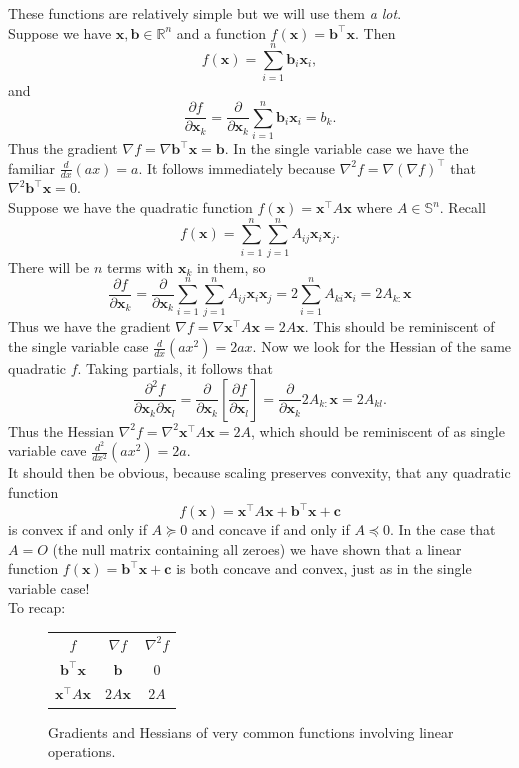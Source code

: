 \documentclass{article}
\newcommand{\1}{\mathbf{1}}
\newcommand{\0}{\mathbf{0}}
\newcommand{\xx}{\mathbf{x}}
\newcommand{\bb}{\mathbf{b}}
\newcommand{\cc}{\mathbf{c}}
\newcommand{\RR}{\mathbb{R}}
\renewcommand{\SS}{\mathbb{S}}
\newcommand{\T}{\top}
\begin{document}
These functions are relatively simple but we will use them \textit{a lot}.\\
Suppose we have $\xx,\bb\in\RR^n$ and a function $f(\xx) = \bb^\T\xx$.
Then
\[
    f(\xx) = \sum_{i=1}^n \bb_i\xx_i,
\]
and
\[
    \frac{\partial f}{\partial \xx_k} = \frac{\partial}{\partial \xx_k} \sum_{i=1}^n \bb_i\xx_i = b_k.
\]
Thus the gradient $\nabla f = \nabla \bb^\T\xx = \bb$. In the single variable case
we have the familiar $\frac{d}{dx}(ax) = a$. It follows immediately because $\nabla^2 f
= \nabla (\nabla f)^\T$ that $\nabla^2 \bb^\T\xx = 0$.\\

Suppose we have the quadratic function $f(\xx) = \xx^\T A\xx$ where $A\in\SS^n$. Recall
\[
    f(\xx) = \sum_{i=1}^n\sum_{j=1}^n A_{ij}\xx_i\xx_j.
\]
There will be $n$ terms with $\xx_k$ in them, so
\[
    \frac{\partial f}{\partial \xx_k} = \frac{\partial}{\partial \xx_k} \sum_{i=1}^n\sum_{j=1}^n A_{ij}\xx_i\xx_j = 2\sum_{i=1}^nA_{ki}\xx_i = 2A_{k:}\xx
\]
Thus we have the gradient $\nabla f = \nabla \xx^\T A\xx = 2A\xx$. This should be reminiscent
of the single variable case $\frac{d}{dx}(ax^2) = 2ax$. Now we look for the Hessian of the
same quadratic $f$. Taking partials, it follows that
\[
    \frac{\partial^2 f}{\partial \xx_k\partial \xx_l} = \frac{\partial}{\partial \xx_k}\left[ \frac{\partial f}{\partial \xx_l} \right] = \frac{\partial}{\partial \xx_k} 2A_{k:}\xx = 2A_{kl}.
\]
Thus the Hessian $\nabla^2 f = \nabla^2 \xx^\T A\xx = 2A$, which should be reminiscent of
as single variable cave $\frac{d^2}{dx^2}(ax^2) = 2a$.\\

It should then be obvious, because scaling preserves convexity, that any quadratic function
\[
    f(\xx) = \xx^\T A\xx + \bb^\T\xx + \cc
\]
is convex if and only if $A \succeq 0$ and concave if and only if $A \preceq 0$. In the case
that $A=O$ (the null matrix containing all zeroes) we have shown that a linear function
$f(\xx) = \bb^\T\xx + \cc$ is both concave and convex, just as in the single variable case!\\

To recap:
\begin{figure}[htpb]
    \centering
    \begin{tabular}{c|c|c}
        $f$ & $\nabla f$ & $\nabla^2 f$\\
        $\bb^\T\xx$ & $\bb$ & $0$\\
        $\xx^\T A\xx$ & $2A\xx$ & $2A$
    \end{tabular}
    \caption{Gradients and Hessians of very common functions
    involving linear operations.}
    \label{table:derivs}
\end{figure}
\end{document}
